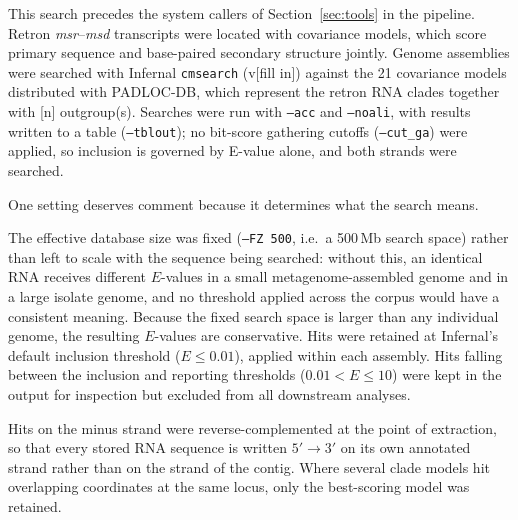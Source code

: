 This search precedes the system callers of Section~\ref{sec:tools} in the pipeline. Retron \emph{msr}--\emph{msd} transcripts were located with covariance models, which score primary sequence and base-paired secondary structure jointly. Genome assemblies were searched with Infernal \texttt{cmsearch} (v[fill in])  against the 21 covariance models distributed with PADLOC-DB, which represent the retron RNA clades together with [n] outgroup(s). Searches were run with \texttt{--acc} and \texttt{--noali}, with results written to a table (\texttt{--tblout}); no bit-score gathering cutoffs (\texttt{--cut\_ga}) were applied, so inclusion is governed by E-value alone, and both strands were searched.


One setting deserves comment because it determines what the search means.

The effective database size was fixed (\texttt{--FZ 500}, i.e.\ a 500\,Mb search space) rather than left to scale with the sequence being searched: without this, an identical RNA receives different
$E$-values in a small metagenome-assembled genome and in a large isolate genome, and
no threshold applied across the corpus would have a consistent meaning. Because the
fixed search space is larger than any individual genome, the resulting $E$-values are
conservative. Hits were retained at Infernal's default inclusion threshold ($E \le 0.01$), applied within each assembly. Hits falling between the inclusion and reporting thresholds ($0.01 < E \le 10$) were kept in the output for inspection but excluded from all downstream analyses.



Hits on the minus strand were reverse-complemented at the point of extraction, so that every stored RNA sequence is written $5'\rightarrow3'$ on its own annotated strand rather than on the strand of the contig. Where several clade models hit overlapping coordinates at the same locus, only the best-scoring model was retained.

